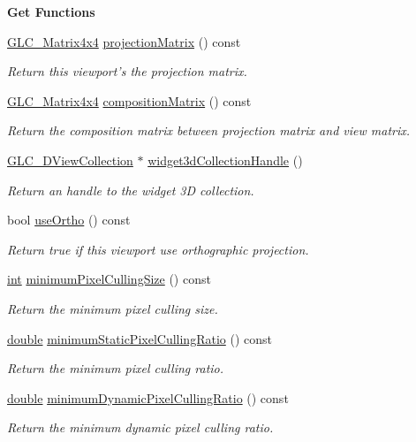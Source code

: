 \begin{Indent}{\bf Get Functions}
\begin{DoxyCompactItemize}
\hyperlink{class_g_l_c___matrix4x4}{G\-L\-C\-\_\-\-Matrix4x4} \hyperlink{class_g_l_c___viewport_a5eaa132ae59b6ee10e735655ba3c7981}{projection\-Matrix} () const 
\begin{DoxyCompactList}\small\item\em Return this viewport's the projection matrix. \end{DoxyCompactList}\item 
\hyperlink{class_g_l_c___matrix4x4}{G\-L\-C\-\_\-\-Matrix4x4} \hyperlink{class_g_l_c___viewport_a14728f4131eac6bbe72dc43b897814e0}{composition\-Matrix} () const 
\begin{DoxyCompactList}\small\item\em Return the composition matrix between projection matrix and view matrix. \end{DoxyCompactList}\item 
\hyperlink{class_g_l_c__3_d_view_collection}{G\-L\-C\-\_\-D\-View\-Collection} $\ast$ \hyperlink{class_g_l_c___viewport_a496ac17f7a0aa1df91b82c22004440fe}{widget3d\-Collection\-Handle} ()
\begin{DoxyCompactList}\small\item\em Return an handle to the widget 3\-D collection. \end{DoxyCompactList}\item 
bool \hyperlink{class_g_l_c___viewport_a0dda1e477c8c17ee8bb35f57284e00e7}{use\-Ortho} () const 
\begin{DoxyCompactList}\small\item\em Return true if this viewport use orthographic projection. \end{DoxyCompactList}\item 
\hyperlink{ioapi_8h_a787fa3cf048117ba7123753c1e74fcd6}{int} \hyperlink{class_g_l_c___viewport_ac3c034d0af74c4210531654242b5e02a}{minimum\-Pixel\-Culling\-Size} () const 
\begin{DoxyCompactList}\small\item\em Return the minimum pixel culling size. \end{DoxyCompactList}\item 
\hyperlink{_super_l_u_support_8h_a8956b2b9f49bf918deed98379d159ca7}{double} \hyperlink{class_g_l_c___viewport_ae1c82d0d6e99a0104fb93c36007866ec}{minimum\-Static\-Pixel\-Culling\-Ratio} () const 
\begin{DoxyCompactList}\small\item\em Return the minimum pixel culling ratio. \end{DoxyCompactList}\item 
\hyperlink{_super_l_u_support_8h_a8956b2b9f49bf918deed98379d159ca7}{double} \hyperlink{class_g_l_c___viewport_a0ade21c5b4181302305ed62e5dc66955}{minimum\-Dynamic\-Pixel\-Culling\-Ratio} () const 
\begin{DoxyCompactList}\small\item\em Return the minimum dynamic pixel culling ratio. \end{DoxyCompactList}\end{DoxyCompactItemize}
\end{Indent}
